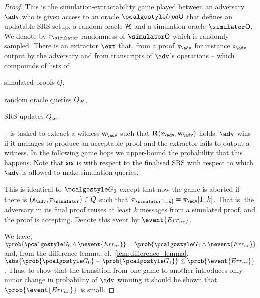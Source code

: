 \begin{proof}		

   This is the simulation-extractability game played between an adversary
  $\advse$ who is given access to an oracle $\initU$ that defines an updatable SRS
  setup, a random oracle $\mathcal{H}$ and a simulation oracle $\simO$. We denote by $\rsim$
  randomness of $\simO$ which is randomly sampled. There is an extractor $\ext$ that,
  from a proof $\zkproof_{\advse}$ for instance $\inp_{\advse}$ output by the
  adversary and from transcripts of $\advse$'s operations -- which compounds of lists
  of
  \begin{inparaenum}[(1)]
  \item simulated proofs $Q$,
  \item random oracle queries $Q_{\mathcal{H}}$,
  \item SRS updates $Q_{\mathsf{srs}}$.
  \end{inparaenum}
  -- is tasked to extract a witness $\wit_{\advse}$ such that
  $\REL(\inp_{\advse}, \wit_{\advse})$ holds. $\advse$ wins if it manages to produce
  an acceptable proof and the extractor fails to output a witness. In the following
  game hops we upper-bound the probability that this happens. Note that $\mathsf{srs}$ is
  with respect to the finalised SRS with respect to which $\adv$ is allowed to make
  simulation queries.

   This is identical to $\game{0}$ except that now the game is aborted if
  there is $(\inp_\advse, \zkproof_{\simulator}) \in Q$ such that
  $\zkproof_\simulator[1..k] = \zkproof_{\advse}[1..k]$. That is, the adversary in
  its final proof reuses at least $k$ messages from a simulated proof, and the proof
  is accepting.  Denote this event by $\event{\errur}$.

     We have,
  \( \prob{\game{0} \land \nevent{\errur}} = \prob{\game{1} \land \nevent{\errur}} \)
  and, from the difference lemma, cf.~\cref{lem:difference_lemma},
  $ \abs{\prob{\game{0}} - \prob{\game{1}}} \leq \prob{\event{\errur}}\,$.  Thus, to
  show that the transition from one game to another introduces only minor change in
  probability of $\adv$ winning it should be shown that $\prob{\event{\errur}}$ is
  small.
  

\end{proof}
